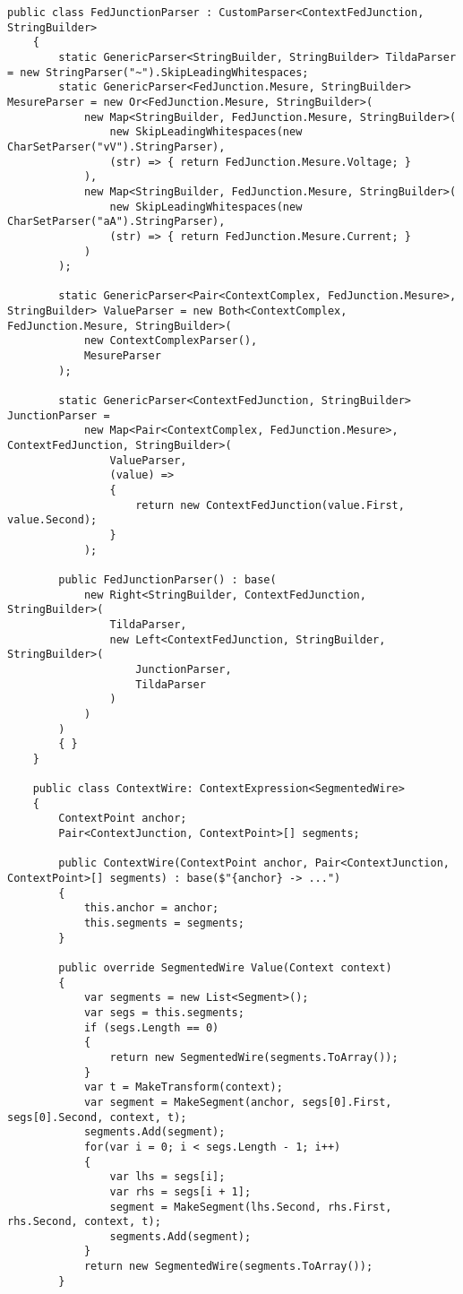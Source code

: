 \documentclass{scrartcl}
\begin{document}
\begin{lstlisting}[language={[Sharp]C}, caption={Wire}, label={experiment}]
    public class FedJunctionParser : CustomParser<ContextFedJunction, StringBuilder>
    {
        static GenericParser<StringBuilder, StringBuilder> TildaParser = new StringParser("~").SkipLeadingWhitespaces;
        static GenericParser<FedJunction.Mesure, StringBuilder> MesureParser = new Or<FedJunction.Mesure, StringBuilder>(
            new Map<StringBuilder, FedJunction.Mesure, StringBuilder>(
                new SkipLeadingWhitespaces(new CharSetParser("vV").StringParser),
                (str) => { return FedJunction.Mesure.Voltage; }
            ),
            new Map<StringBuilder, FedJunction.Mesure, StringBuilder>(
                new SkipLeadingWhitespaces(new CharSetParser("aA").StringParser),
                (str) => { return FedJunction.Mesure.Current; }
            )
        );

        static GenericParser<Pair<ContextComplex, FedJunction.Mesure>, StringBuilder> ValueParser = new Both<ContextComplex, FedJunction.Mesure, StringBuilder>(
            new ContextComplexParser(),
            MesureParser
        );

        static GenericParser<ContextFedJunction, StringBuilder> JunctionParser =
            new Map<Pair<ContextComplex, FedJunction.Mesure>, ContextFedJunction, StringBuilder>(
                ValueParser,
                (value) =>
                {
                    return new ContextFedJunction(value.First, value.Second);
                }
            );

        public FedJunctionParser() : base(
            new Right<StringBuilder, ContextFedJunction, StringBuilder>(
                TildaParser,
                new Left<ContextFedJunction, StringBuilder, StringBuilder>(
                    JunctionParser,
                    TildaParser
                )
            )
        )
        { }
    }

    public class ContextWire: ContextExpression<SegmentedWire>
    {
        ContextPoint anchor;
        Pair<ContextJunction, ContextPoint>[] segments;

        public ContextWire(ContextPoint anchor, Pair<ContextJunction, ContextPoint>[] segments) : base($"{anchor} -> ...")
        {
            this.anchor = anchor;
            this.segments = segments;
        }

        public override SegmentedWire Value(Context context)
        {
            var segments = new List<Segment>();
            var segs = this.segments;
            if (segs.Length == 0)
            {
                return new SegmentedWire(segments.ToArray());
            }
            var t = MakeTransform(context);
            var segment = MakeSegment(anchor, segs[0].First, segs[0].Second, context, t);
            segments.Add(segment);
            for(var i = 0; i < segs.Length - 1; i++)
            {
                var lhs = segs[i];
                var rhs = segs[i + 1];
                segment = MakeSegment(lhs.Second, rhs.First, rhs.Second, context, t);
                segments.Add(segment);
            }
            return new SegmentedWire(segments.ToArray());
        }


\end{lstlisting}
\end{document}
